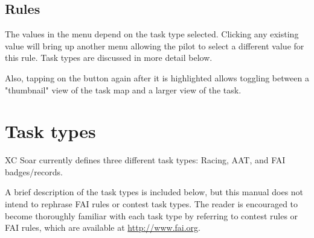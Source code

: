 \subsection*{Rules}
The values in the menu depend on the task type selected. Clicking any existing
 value will bring up another menu allowing the pilot to select a
different value for this rule.  Task types are discussed in more detail below.

Also, tapping on the  button again after it is highlighted allows
toggling between a "thumbnail" view of the task map and a larger view of the task.

\section{Task types}
XC Soar currently defines three different task types: Racing, AAT, and FAI badges/records.

A brief description of the task types is included below, but this manual does
not intend to rephrase FAI rules or contest task types. The reader is encouraged
to become thoroughly familiar with each task type by referring to contest rules
or FAI rules, which are available at \url{http://www.fai.org}.


